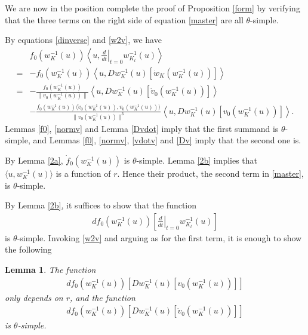 \documentclass[12pt]{amsart}
\newtheorem{lemma}[theorem]{Lemma}
\theoremstyle{definition}
\begin{document}
We are now in the position complete the proof of Proposition \ref{form} by verifying that the three terms on the right side of equation \eqref{master} are all $\theta$-simple. 

\medskip

 By equations \eqref{dinverse} and \eqref{w2v}, we have
\begin{align*}
 &f_0(w_K^{-1}(u))\left\langle u, \left.\frac{d}{dt}\right|_{t=0} w^{-1}_{K_t}(u)\right\rangle  
\\ =& -f_0(w_K^{-1}(u))\left\langle u,  Dw_K^{-1}(u)\left[  \dot{w}_K(w_K^{-1}(u))\right]\right\rangle \\ =&-\frac{f_0(w_K^{-1}(u))}{\|v_0(w_K^{-1}(u))\|}\left\langle u,  Dw_K^{-1}(u)\left[  \dot{v}_0(w_K^{-1}(u))\right]\right\rangle \\ &-\frac{f_0(w_K^{-1}(u))\langle\dot{v}_0(w_K^{-1}(u)),v_0(w_K^{-1}(u)) \rangle}{\|v_0(w_K^{-1}(u))\|^3}\left\langle u,  Dw_K^{-1}(u)\left[ v_0(w_K^{-1}(u))\right]\right\rangle.
\end{align*}
Lemmas \ref{f0}, \ref{normv} and Lemma \ref{Dvdot} imply that the first summand is $\theta$-simple, and Lemmas \ref{f0}, \ref{normv}, \ref{vdotv} and  \ref{Dv} imply that the second one is.

\medskip

By Lemma \ref{2a}, $\dot{f}_0(w_{K}^{-1}(u))$ is $\theta$-simple. Lemma \ref{2b} implies that $\langle u, w_K^{-1}(u)\rangle$ is a function of $r$. Hence their product, the second term in \eqref{master}, is $\theta$-simple.


\medskip

 By Lemma \ref{2b}, it suffices to show that the function
\begin{align*}
 df_0 (w_{K}^{-1}(u)) \left[  \left.\frac{d}{dt}\right|_{t=0} w^{-1}_{K_t}(u)\right]
\end{align*}
is $\theta$-simple. Invoking \eqref{w2v} and arguing as for the first term, it is enough to show the following
\begin{lemma}\label{nail}
The function 
\begin{align*}
     df_0 (w_{K}^{-1}(u)) \left[Dw_K^{-1}(u)\left[ v_0(w^{-1}_{K}(u))\right]\right]
\end{align*}
only depends on $r$, and the function
\begin{align*}
     df_0 (w_{K}^{-1}(u)) \left[Dw_K^{-1}(u)\left[ \dot{v}_0(w^{-1}_{K}(u))\right]\right]
\end{align*}
is $\theta$-simple.
\end{lemma}
\end{document}
